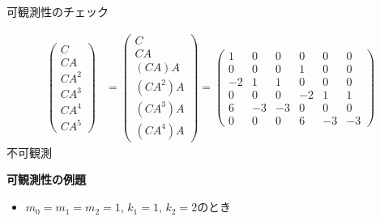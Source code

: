 \documentclass[a4paper,11pt]{jreport}
\begin{document}
可観測性のチェック

\begin{align}
 \left(\begin{array}{l}
        C \\
        CA \\
        CA^2  \\
	CA^3 \\
	CA^4 \\
	CA^5
       \end{array}\right)
 &=
 \left(\begin{array}{l}
        C \\
        CA \\
        (CA)A  \\
	(CA^2)A \\
	(CA^3)A \\
	(CA^4)A
       \end{array}\right)
 =
 \left(\begin{array}{rrrrrr}
        1 & 0 & 0 & 0 & 0 & 0      \\
        0 & 0 & 0 & 1 & 0 & 0      \\
        -2& 1 & 1 & 0 & 0 & 0      \\
	0 & 0 & 0 & -2& 1 & 1 \\
	6 & -3& -3& 0 & 0 & 0 \\
	0 & 0 & 0 & 6 & -3& -3 
       \end{array}\right)
\nonumber
\end{align}
不可観測




\newpage

\noindent
{\bf 可観測性の例題}

\begin{itemize}
\item $m_0=m_1=m_2=1$, $k_1=1$, $k_2=2$のとき
\end{itemize}
\end{document}
